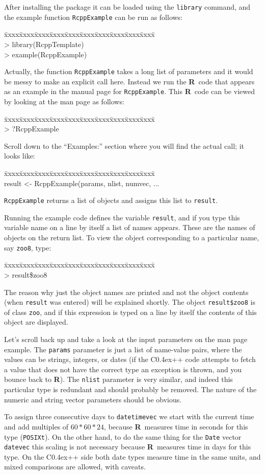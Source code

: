 \documentclass{article}
\newenvironment{program}{\ttfamily\begin{tabbing}
\=xxxx\=xxxx\=xxxx\=xxxx\=xxxx\=xxxx\=xxxx\=xxxx\=xxxx\=xxxx\= \+ \kill \\
}{\end{tabbing}}
\def\C++{C{\raise 0.4ex\hbox{\tiny ++}}}
\newcommand{\R}{{\bf R}}
\begin{document}
After installing the package it can be loaded using the {\tt library}
command, and the example function {\tt RcppExample} can be run as follows:
\begin{program}
> library(RcppTemplate)\\
> example(RcppExample)
\end{program}
Actually, the function {\tt RcppExample} takes a long list of parameters
and it would be messy to make an explicit call here. Instead we
run the \R\ code that appears as an example in the manual page for
{\tt RcppExample}. This \R\ code can be viewed by looking at the
man page as follows:
\begin{program}
> ?RcppExample
\end{program}
Scroll down to the ``Examples:'' section where you will
find the actual call; it looks like:
\begin{program}
result <- RcppExample(params, nlist, numvec, ...
\end{program}
{\tt RcppExample} returns a list of objects and assigns this list to
{\tt result}. 

Running the example code defines the variable {\tt result}, and if you
type this variable name on a line by itself a list of names appears.
These are the names of objects on the return list. To view the object
corresponding to a particular name, say {\tt zoo8}, type:
\begin{program}
>  result\$zoo8
\end{program}
The reason why just the object names are printed and not the object contents
(when {\tt result} was entered) will be explained shortly. The object
{\tt result\$zoo8} is of class {\tt zoo}, and if this expression is typed
on a line by itself the contents of this object are displayed.

Let's scroll back up and take a look at the input
parameters on the man page example. The {\tt params} parameter is just
a list of name-value pairs, where the values can be strings,
integers, or dates (if the \C++ code attempts to fetch a value that does
not have the correct type an exception is thrown, and you bounce back
to \R). The {\tt nlist} parameter is very similar, and indeed this
particular type is redundant and should probably be removed.
The nature of the numeric and string vector parameters 
should be obvious.

To assign three consecutive days to {\tt datetimevec} we start with
the current time and add multiples of $60*60*24$, because \R\ measures
time in seconds for this type ({\tt POSIXt}). On the other hand, 
to do the same thing
for the {\tt Date} vector {\tt datevec} this scaling is not
necessary because \R\ measures time in days for this type. On the
\C++ side both date types measure time in the same units, and
mixed comparisons are allowed, with caveats.
\end{document}
